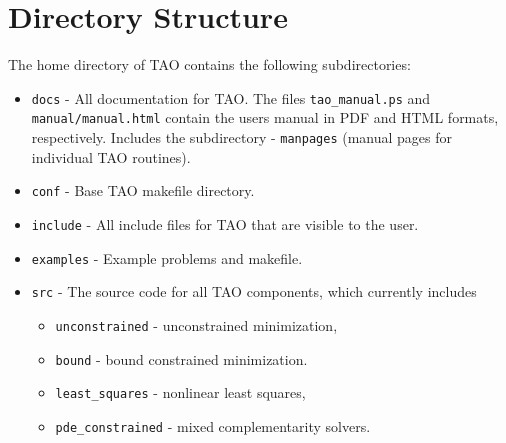 \section{Directory Structure}

The home directory of TAO contains the following subdirectories:

\begin{itemize}
\item \texttt{docs} - All documentation for TAO. The files \texttt{tao\_manual.ps}
                   and \texttt{manual/manual.html} contain the users manual in
                   PDF and HTML formats, respectively. Includes
                   the subdirectory
 \subitem - \texttt{manpages} (manual pages for individual TAO routines).
\item \texttt{conf} - Base TAO makefile directory.  
\item \texttt{include} - All include files for TAO that are visible to the user.
\item \texttt{examples} - Example problems and makefile.
\item \texttt{src} - The source code for all TAO components, which
                  currently includes
 \begin{itemize}
 \item \texttt{unconstrained} - unconstrained minimization,
 \item \texttt{bound} - bound constrained minimization.
 \item \texttt{least\_squares} - nonlinear least squares,
 \item \texttt{pde\_constrained} - mixed complementarity solvers.
 \end{itemize}
\end{itemize}

